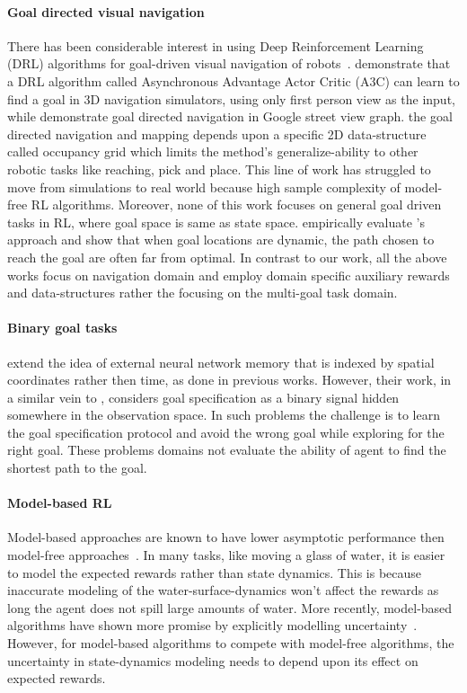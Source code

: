 \paragraph{Goal directed visual navigation}
There has been considerable interest in using Deep Reinforcement Learning (DRL)
algorithms for goal-driven visual navigation of
robots~\citep{mirowski2016learning,MiPaViICLR2017,dhiman2018critical,gupta2017cognitive,savinov2018semi}.
\cite{mirowski2016learning} demonstrate that a DRL algorithm called Asynchronous
Advantage Actor Critic (A3C) can learn to find a goal in 3D navigation
simulators, using only first person view as the input, while
\cite{MiPaViICLR2017} demonstrate goal directed navigation in Google street view
graph. \citet{gupta2017cognitive} the goal directed navigation and mapping
depends upon a specific 2D data-structure called occupancy grid which limits the
method's generalize-ability to other robotic tasks like reaching, pick and
place. This line of work has struggled to move from simulations to real world
because high sample complexity of model-free RL algorithms. Moreover, none of
this work focuses on general goal driven tasks in RL, where goal space is same
as state space. \citet{dhiman2018critical} empirically evaluate
\cite{mirowski2016learning}'s approach and show that when goal locations are
dynamic, the path chosen to reach the goal are often far from optimal.
In contrast to our work, all the above works focus on navigation domain and
employ domain specific auxiliary rewards and data-structures rather the focusing
on the multi-goal task domain.

\paragraph{Binary goal tasks}
\citet{parisotto2017neural} extend the idea of external neural network memory
that is indexed by spatial coordinates rather then time, as done in previous
works. However, their work, in a similar vein to \cite{OhChSiICML2016},
considers goal specification as a binary signal hidden somewhere in the
observation space. In such problems the challenge is to learn the goal
specification protocol and avoid the wrong goal while exploring for the right
goal. These problems domains not evaluate the ability of agent to find the
shortest path to the goal.

\paragraph{Model-based RL}
Model-based approaches are known to have lower asymptotic performance then
model-free approaches~\cite{pong2018temporal}. In many tasks, like moving a
glass of water, it is easier to model the expected rewards rather than state
dynamics. This is because inaccurate modeling of the water-surface-dynamics
won't affect the rewards as long the agent does not spill large amounts of
water. More recently, model-based algorithms have shown more promise by
explicitly modelling uncertainty~\cite{lakshminarayanan2017simple,
  kurutach2018model,zhang2018solar}.
However, for model-based algorithms to compete with model-free algorithms, the
uncertainty in state-dynamics modeling needs to depend upon its effect on
expected rewards.


